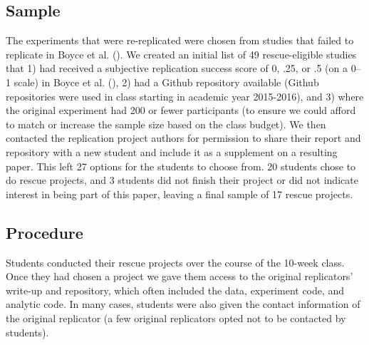 \documentclass[
  english,
  a4paper,
]{article}
\begin{document}
\subsection{Sample}\label{sample}

The experiments that were re-replicated were chosen from studies that failed to replicate in Boyce et al. ().
We created an initial list of 49 rescue-eligible studies that 1) had received a subjective replication success score of 0, .25, or .5 (on a 0--1 scale) in Boyce et al. (), 2) had a Github repository available (Github repositories were used in class starting in academic year 2015-2016), and 3) where the original experiment had 200 or fewer participants (to ensure we could afford to match or increase the sample size based on the class budget).
We then contacted the replication project authors for permission to share their report and repository with a new student and include it as a supplement on a resulting paper.
This left 27 options for the students to choose from.
20 students chose to do rescue projects, and 3 students did not finish their project or did not indicate interest in being part of this paper, leaving a final sample of 17 rescue projects.

\subsection{Procedure}\label{procedure}

Students conducted their rescue projects over the course of the 10-week class.
Once they had chosen a project we gave them access to the original replicators' write-up and repository, which often included the data, experiment code, and analytic code.
In many cases, students were also given the contact information of the original replicator (a few original replicators opted not to be contacted by students).
\end{document}
